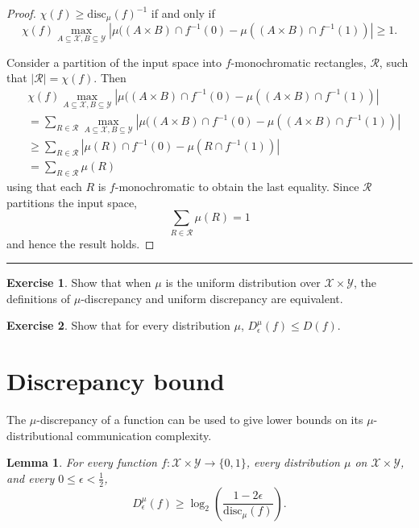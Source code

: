 \documentclass[11pt]{amsart}
\theoremstyle{plain}
\newtheorem{lemma}{Lemma}
\theoremstyle{definition}
\newtheorem{exercise}{Exercise}
\theoremstyle{plain}
\newcommand{\calX}{\mathcal{X}}
\newcommand{\calY}{\mathcal{Y}}
\newcommand{\disc}{\mathrm{disc}}
\newcommand{\exercises}{\bigskip \noindent\rule{8cm}{0.4pt} \medskip}
\begin{document}
\begin{proof}
	
$\chi(f) \geq \disc_\mu(f)^{-1}$ if and only if
$$\chi(f)\max_{A \subseteq \calX, B \subseteq \calY}\left|\mu((A\times B)\cap f^{-1}(0) -\mu((A\times B)\cap f^{-1}(1)) \right| \geq 1.$$

Consider a partition of the input space into $f$-monochromatic rectangles, $\mathcal R$, such that $|\mathcal R| = \chi(f)$. Then
\begin{align*}
&\chi(f)\max_{A \subseteq \calX, B \subseteq \calY}\left|\mu((A\times B)\cap f^{-1}(0) -\mu((A\times B)\cap f^{-1}(1)) \right| \\
& = \sum_{R\in \mathcal R}\max_{A \subseteq \calX, B \subseteq \calY}\left|\mu((A\times B)\cap f^{-1}(0) -\mu((A\times B)\cap f^{-1}(1)) \right|\\ 
&\geq \sum_{R \in \mathcal{R}}\left|\mu(R)\cap f^{-1}(0) -\mu(R\cap f^{-1}(1)) \right|\\ 
&= \sum_{R \in \mathcal{R}} \mu(R)
\end{align*}
using that each $R$ is $f$-monochromatic to obtain the last equality. Since $\mathcal R$ partitions the input space,
$$\sum_{R \in \mathcal R} \mu(R)=1$$
and hence the result holds.
\end{proof}

\exercises

\begin{exercise}
Show that when $\mu$ is the uniform distribution over $\calX \times \calY$, the definitions of $\mu$-discrepancy and uniform discrepancy are equivalent.
\end{exercise}

\begin{exercise}
Show that for every distribution $\mu$, $D^\mu_\epsilon(f) \le D(f)$.
\end{exercise}


\newpage \section{Discrepancy bound}

The $\mu$-discrepancy of a function can be used to give lower bounds on its $\mu$-distributional communication complexity.

\begin{lemma}
For every function $f : \calX \times \calY \to \{0,1\}$, every distribution $\mu$ on $\calX \times \calY$, and every $0 \le \epsilon < \frac12$,
\[
D_\epsilon^{\mu}(f) \ge \log_2 \left( \frac{1-2\epsilon}{\disc_\mu(f)} \right).
\]
\end{lemma}
\end{document}
